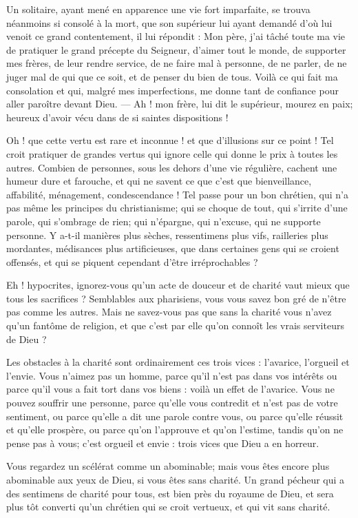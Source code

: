 \documentclass[instructions.tex]{subfiles}
\begin{document}
Un solitaire, ayant mené en apparence une vie fort imparfaite, se trouva néanmoins si consolé à la mort, que son supérieur lui ayant demandé d’où lui venoit ce grand contentement, il lui répondit : Mon père, j’ai tâché toute ma vie de pratiquer le grand précepte du Seigneur, d’aimer tout le monde, de supporter mes frères, de leur rendre service, de ne faire mal à personne, de ne parler, de ne juger mal de qui que ce soit, et de penser du bien de tous. Voilà ce qui fait ma consolation et qui, malgré mes imperfections, me donne tant de confiance pour aller paroître devant Dieu. — Ah ! mon frère, lui dit le supérieur, mourez en paix; heureux d’avoir vécu dans de si saintes dispositions !
 
\secundo Oh ! que cette vertu est rare et inconnue ! et que d’illusions sur ce point ! Tel croit pratiquer de grandes vertus qui ignore celle qui donne le prix à toutes les autres. Combien de personnes, sous les dehors d’une vie régulière, cachent une humeur dure et farouche, et qui ne savent ce que c’est que bienveillance, affabilité, ménagement, condescendance ! Tel passe pour un bon chrétien, qui n’a pas même les principes du christianisme; qui se choque de tout, qui s’irrite d’une parole, qui s’ombrage de rien; qui n’épargne, qui n’excuse, qui ne supporte personne. Y a-t-il manières plus sèches, ressentimens plus vifs, railleries plus mordantes, médisances plus artificieuses, que dans certaines gens qui se croient offensés, et qui se piquent cependant d’être irréprochables ?
 
Eh ! hypocrites, ignorez-vous qu’un acte de douceur et de charité vaut mieux que tous les sacrifices ? Semblables aux pharisiens, vous vous savez bon gré de n’être pas comme les autres. Mais ne savez-vous pas que sans la charité vous n’avez qu’un fantôme de religion, et que c’est par elle qu’on connoît les vrais serviteurs de Dieu ?
 
Les obstacles à la charité sont ordinairement ces trois vices : l’avarice, l’orgueil et l’envie. Vous n’aimez pas un homme, parce qu’il n’est pas dans vos intérêts ou parce qu’il vous a fait tort dans vos biens : voilà un effet de l’avarice. Vous ne pouvez souffrir une personne, parce qu’elle vous contredit et n’est pas de votre sentiment, ou parce qu’elle a dit une parole contre vous, ou parce qu’elle réussit et qu’elle prospère, ou parce qu’on l’approuve et qu’on l’estime, tandis qu’on ne pense pas à vous; c’est orgueil et envie : trois vices que Dieu a en horreur.
 
Vous regardez un scélérat comme un abominable; mais vous êtes encore plus abominable aux yeux de Dieu, si vous êtes sans charité. Un grand pécheur qui a des sentimens de charité pour tous, est bien près du royaume de Dieu, et sera plus tôt converti qu’un chrétien qui se croit vertueux, et qui vit sans charité.
 
\end{document}
